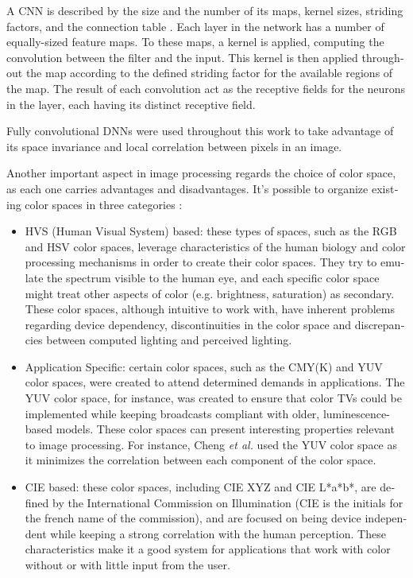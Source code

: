 \documentclass[12pt,openright,oneside,a4paper,english]{abntex2}
\begin{document}
\begin{otherlanguage}{english}
A CNN is described by the size and the number of its maps, kernel sizes, striding factors, and the connection table \cite{Ciresan2011}. Each layer in the network has a number of equally-sized feature maps. To these maps, a kernel is applied, computing the convolution between the filter and the input. This kernel is then applied throughout the map according to the defined striding factor for the available regions of the map. The result of each convolution act as the receptive fields for the neurons in the layer, each having its distinct receptive field.

Fully convolutional DNNs were used throughout this work to take advantage of its space invariance and local correlation between pixels in an image.

Another important aspect in image processing regards the choice of color space, as each one carries advantages and disadvantages. It's possible to organize existing color spaces in three categories \cite{colorspace}:
\begin{itemize}
    \item HVS (Human Visual System) based: these types of spaces, such as the RGB and HSV color spaces, leverage characteristics of the human biology and color processing mechanisms in order to create their color spaces. They  try to emulate the spectrum visible to the human eye, and each specific color space might treat other aspects of color (e.g. brightness, saturation) as secondary. These color spaces, although intuitive to work with, have inherent problems regarding device dependency, discontinuities in the color space and discrepancies between computed lighting and perceived lighting.
    \item Application Specific: certain color spaces, such as the CMY(K) and YUV color spaces, were created to attend determined demands in applications. The YUV color space, for instance, was created to ensure that color TVs could be implemented while keeping broadcasts compliant with older, luminescence-based models. These color spaces can present interesting properties relevant to image processing. For instance, Cheng \textit{et al.} \cite{Cheng2015} used the YUV color space as it minimizes the correlation between each component of the color space.
    \item  CIE based: these color spaces, including CIE XYZ and CIE L*a*b*, are defined by the International Commission on Illumination (CIE is the initials for the french name of the commission),  and are focused on being device independent while keeping a strong correlation with the human perception. These characteristics make it a good system for applications that work with color without or with little input from the user.
\end{itemize}


\end{otherlanguage}
\end{document}
